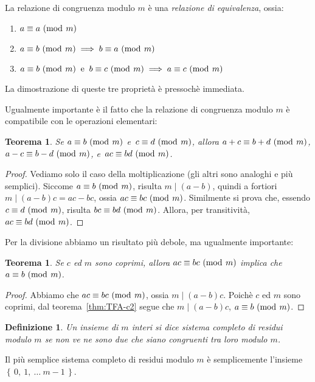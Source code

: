 \documentclass[pdflatex,11pt,a4paper,oneside]{article}
\newcommand{\acro}[1]{\text{{\frenchspacing {#1} }}}
\newcommand{\ie}[0]{\acro{i.e.}}
\newcommand{\p}[1]{\left({#1}\right)}
\newcommand{\divides}[0]{\mid}
\newcommand{\congruent}[0]{\equiv}
\newcommand{\mmodop}[0]{\ensuremath{\operatorname{mod}}}
\newcommand{\mmod}[1]{\ensuremath{\allowbreak\ (\mmodop\:{#1})}}
\newcommand{\set}[1]{\ensuremath{\left\{\,{#1}\,\right\}}}
\newtheorem{theorem}[TheoremLike]{Teorema}
\newtheorem{definition}[TheoremLike]{Definizione}
\begin{document}
La relazione di congruenza modulo $m$ \`e una \emph{relazione di
equivalenza}, ossia:
\begin{enumerate}
\item $a \congruent a \mmod m$
\item $a \congruent b \mmod m \implies b \congruent a \mmod m$
\item $a \congruent b \mmod m ~\:\textrm{e}\:~
       b \congruent c \mmod m \implies
       a \congruent c \mmod m$
\end{enumerate}
La dimostrazione di queste tre propriet\`a \`e pressoch\`e immediata.

\smallskip
Ugualmente importante \`e il fatto che la relazione di congruenza
modulo $m$ \`e compatibile con le operazioni elementari:
%
\begin{theorem}
Se $a \congruent b \mmod m$ e\, $c \congruent d \mmod m$, allora
$a + c \congruent b + d \mmod m$, $a - c \congruent b - d \mmod m$,
e\, $ac \congruent bd \mmod m$.
\end{theorem}
%
\begin{proof}
Vediamo solo il caso della moltiplicazione (gli altri sono analoghi
e pi\`u semplici).  Siccome $a \congruent b \mmod m$, risulta
$m \divides \p{a - b}$, quindi a fortiori $m \divides \p{a - b}c =
ac - bc$, ossia $ac \congruent bc \mmod m$.  Similmente si prova
che, essendo $c \congruent d \mmod m$, risulta $bc \congruent bd
\mmod m$.  Allora, per transitivit\`a, $ac \congruent bd \mmod m$.
\end{proof}

Per la divisione abbiamo un risultato pi\`u debole, ma ugualmente
importante:
%
\begin{theorem}\label{thm:simplify-modulo-m}
Se $c$ ed $m$ sono coprimi, allora $ac \congruent bc \mmod m$ implica
che $a \congruent b \mmod m$.
\end{theorem}
%
\begin{proof}
Abbiamo che $ac \congruent bc \mmod m$, ossia $m \divides \p{a -b}c$.
Poich\`e $c$ ed $m$ sono coprimi, dal teorema~\eqref{thm:TFA-c2}
segue che $m \divides \p{a -b}c$, \ie $a \congruent b \mmod m$.
\end{proof}

\begin{definition}
Un insieme di $m$ interi si dice \emph{sistema completo di residui modulo
$m$} se non ve ne sono due che siano congruenti tra loro modulo $m$.
\end{definition}

Il pi\`u semplice sistema completo di residui modulo $m$ \`e semplicemente
l'insieme $\set{0,\: 1,\: \ldots\: m - 1}$.
\end{document}
